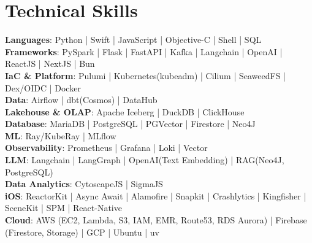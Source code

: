 \section{Technical Skills}
    \begin{itemize}[leftmargin=0.15in, label={}]
	\small{
        \item{
    	\textbf{Languages}{: Python | Swift | JavaScript | Objective-C | Shell | SQL}
            \\
            \textbf{Frameworks}{: PySpark | Flask | FastAPI | Kafka | Langchain | OpenAI | ReactJS | NextJS | Bun}
            \\
            \textbf{IaC \& Platform}{: Pulumi | Kubernetes(kubeadm) | Cilium | SeaweedFS | Dex/OIDC | Docker}
            \\
            \textbf{Data}{: Airflow | dbt(Cosmos) | DataHub}
            \\
            \textbf{Lakehouse \& OLAP}{: Apache Iceberg | DuckDB | ClickHouse}
            \\
            \textbf{Database}{: MariaDB | PostgreSQL | PGVector | Firestore | Neo4J}
            \\
            \textbf{ML}{: Ray/KubeRay | MLflow}
            \\
            \textbf{Observability}{: Prometheus | Grafana | Loki | Vector}
            \\
            \textbf{LLM}{: Langchain | LangGraph | OpenAI(Text Embedding) | RAG(Neo4J, PostgreSQL)}
            \\
            \textbf{Data Analytics}{: CytoscapeJS | SigmaJS}
            \\
            \textbf{iOS}{: ReactorKit | Async Await | Alamofire | Snapkit | Crashlytics | Kingfisher | SceneKit | SPM | React-Native}
            \\
            \textbf{Cloud}{: AWS (EC2, Lambda, S3, IAM, EMR, Route53, RDS Aurora) | Firebase (Firestore, Storage) | GCP | Ubuntu | uv}
        }
    }

    \end{itemize}
